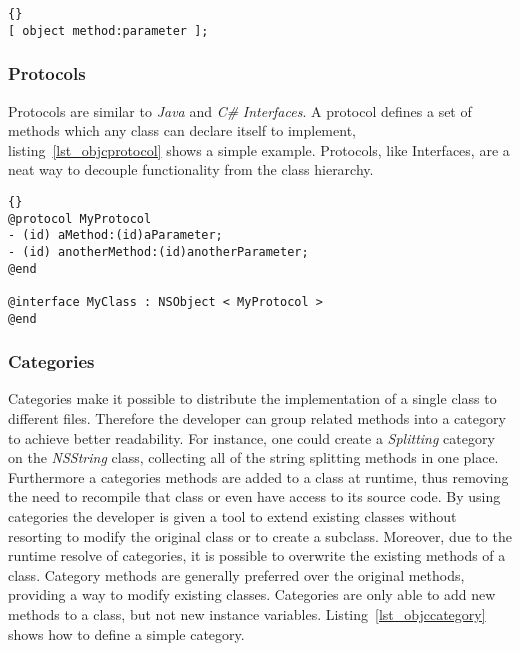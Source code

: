 \begin{lstlisting}[captionpos=b, caption=An Objective-C message send,
label=lst_objcmsgsend]{}
[ object method:parameter ];
\end{lstlisting}

\subsubsection{Protocols}
Protocols are similar to \textit{Java}\cite{book:java-language} and
\textit{C\#}\cite{book:csharp-language} \textit{Interfaces}. A protocol defines
a set of methods which any class can declare itself to implement,
listing~\ref{lst_objcprotocol} shows a simple example. Protocols, like
Interfaces, are a neat way to decouple functionality from the class hierarchy.

\begin{lstlisting}[captionpos=b, caption=An Objective-C protocol and a
class adopting it.,
label=lst_objcprotocol]{}
@protocol MyProtocol
- (id) aMethod:(id)aParameter;
- (id) anotherMethod:(id)anotherParameter;
@end

@interface MyClass : NSObject < MyProtocol >
@end
\end{lstlisting}

\subsubsection{Categories}
Categories make it possible to distribute the implementation of a single class
to different files. Therefore the developer can group related methods into a
category to achieve better readability. For instance, one could create a
\textit{Splitting} category on the \textit{NSString} class, collecting all of
the string splitting methods in one place.
Furthermore a categories methods are added to a class at runtime, thus
removing the need to recompile that class or even have access to its source
code. By using categories the developer is given a tool to extend existing
classes without resorting to modify the original class or to create a subclass.
Moreover, due to the runtime resolve of categories, it is possible to overwrite
the existing methods of a class. Category methods are generally preferred over
the original methods, providing a way to modify existing classes. Categories are
only able to add new methods to a class, but not new instance variables.
Listing~\ref{lst_objccategory} shows how to define a simple category.

